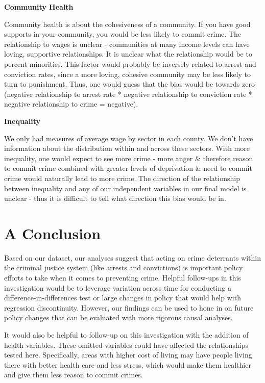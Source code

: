 \documentclass[]{article}
\begin{document}
\textbf{Community Health}

Community health is about the cohesiveness of a community. If you have
good supports in your community, you would be less likely to commit
crime. The relationship to wages is unclear - communities at many income
levels can have loving, supportive relationships. It is unclear what the
relationship would be to percent minorities. This factor would probably
be inversely related to arrest and conviction rates, since a more
loving, cohesive community may be less likely to turn to punishment.
Thus, one would guess that the bias would be towards zero (negative
relationship to arrest rate * negative relationship to conviction rate *
negative relationship to crime = negative).

\textbf{Inequality}

We only had measures of average wage by sector in each county. We don't
have information about the distribution within and across these sectors.
With more inequality, one would expect to see more crime - more anger \&
therefore reason to commit crime combined with greater levels of
deprivation \& need to commit crime would naturally lead to more crime.
The direction of the relationship between inequality and any of our
independent variables in our final model is unclear - thus it is
difficult to tell what direction this bias would be in.

\hypertarget{a-conclusion}{%
\section{A Conclusion}\label{a-conclusion}}

Based on our dataset, our analyses suggest that acting on crime
deterrants within the criminal justice system (like arrests and
convictions) is important policy efforts to take when it comes to
preventing crime. Helpful follow-ups in this investigation would be to
leverage variation across time for conducting a
difference-in-differences test or large changes in policy that would
help with regression discontinuity. However, our findings can be used to
hone in on future policy changes that can be evaluated with more
rigorous causal analyses.

It would also be helpful to follow-up on this investigation with the
addition of health variables. These omitted variables could have
affected the relationships tested here. Specifically, areas with higher
cost of living may have people living there with better health care and
less stress, which would make them healthier and give them less reason
to commit crimes.
\end{document}
